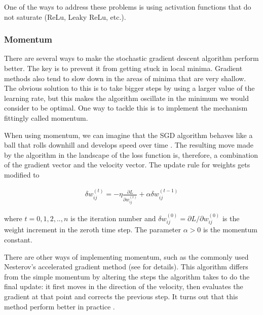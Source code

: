  One of the ways to address these problems is using activation functions that do not saturate (ReLu, Leaky ReLu, etc.). \cite{mehlig} \cite{stanford-L4}

\subsubsection{Momentum}

There are several ways to make the stochastic gradient descent algorithm perform better. The key is to prevent it from getting stuck in local minima. Gradient methods also tend to slow down in the areas of minima that are very shallow. The obvious solution to this is to take bigger steps by using a larger value of the learning rate, but this makes the algorithm oscillate in the minimum we would consider to be optimal. \cite{mehlig} One way to tackle this is to implement the mechanism fittingly called momentum. 

When using momentum, we can imagine that the SGD algorithm behaves like a ball that rolls downhill and develops speed over time \cite{stanford-L7}. The resulting move made by the algorithm in the landscape of the loss function is, therefore, a combination of the gradient vector and the velocity vector. The update rule for weights gets modified to \cite{mehlig}

\begin{gather}
\delta w_{ij}^{(t)} = - \eta \frac{\partial L}{\partial w_{ij}^{(t)}} + \alpha \delta w_{ij}^{(t-1)} 
\end{gather}

\noindent where $ t=0,1,2,..,n $ is the iteration number and $ \delta w_{ij}^{(0)} = \partial L / \partial w_{ij}^{(0)} $ is the weight increment in the zeroth time step. The parameter $ \alpha > 0$ is the momentum constant. 

There are other ways of implementing momentum, such as the commonly used Nesterov's accelerated gradient method (see \cite{mehlig} \cite{stanford-github} for details). This algorithm differs from the simple momentum by altering the steps the algorithm takes to do the final update: it first moves in the direction of the velocity, then evaluates the gradient at that point and corrects the previous step. It turns out that this method perform better in practice \cite{stanford-L7}.


